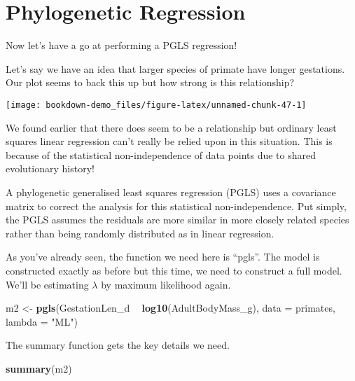 \documentclass[]{book}
\newenvironment{Shaded}{\begin{snugshade}}{\end{snugshade}}
\newcommand{\KeywordTok}[1]{\textcolor[rgb]{0.13,0.29,0.53}{\textbf{#1}}}
\newcommand{\DataTypeTok}[1]{\textcolor[rgb]{0.13,0.29,0.53}{#1}}
\newcommand{\StringTok}[1]{\textcolor[rgb]{0.31,0.60,0.02}{#1}}
\newcommand{\OperatorTok}[1]{\textcolor[rgb]{0.81,0.36,0.00}{\textbf{#1}}}
\newcommand{\NormalTok}[1]{#1}
\begin{document}
\section{Phylogenetic Regression}\label{phylogenetic-regression}

Now let's have a go at performing a PGLS regression!

Let's say we have an idea that larger species of primate have longer
gestations. Our plot seems to back this up but how strong is this
relationship?

\begin{center}\texttt{[image: bookdown-demo\_files/figure-latex/unnamed-chunk-47-1]} \end{center}

We found earlier that there does seem to be a relationship but ordinary
least squares linear regression can't really be relied upon in this
situation. This is because of the statistical non-independence of data
points due to shared evolutionary history!

A phylogenetic generalised least squares regression (PGLS) uses a
covariance matrix to correct the analysis for this statistical
non-independence. Put simply, the PGLS assumes the residuals are more
similar in more closely related species rather than being randomly
distributed as in linear regression.

As you've already seen, the function we need here is ``pgls''. The model
is constructed exactly as before but this time, we need to construct a
full model. We'll be estimating \(\lambda\) by maximum likelihood again.

\begin{Shaded}
\begin{Highlighting}[]
\NormalTok{m2 <-}\StringTok{ }\KeywordTok{pgls}\NormalTok{(GestationLen_d }\OperatorTok{~}\StringTok{ }\KeywordTok{log10}\NormalTok{(AdultBodyMass_g), }\DataTypeTok{data =}\NormalTok{ primates, }\DataTypeTok{lambda =} \StringTok{"ML"}\NormalTok{)}
\end{Highlighting}
\end{Shaded}

The summary function gets the key details we need.

\begin{Shaded}
\begin{Highlighting}[]
\KeywordTok{summary}\NormalTok{(m2)}
\end{Highlighting}
\end{Shaded}
\end{document}
